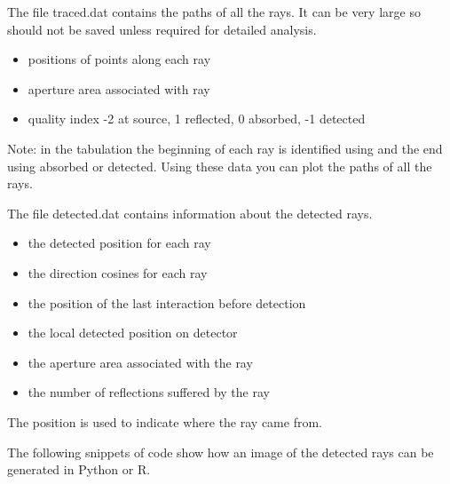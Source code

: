 \documentclass[letterpaper,10pt,english]{sphinxmanual}
\begin{document}
The file traced.dat contains the paths of all the rays. It can be very large
so should not be saved unless required for detailed analysis.
\begin{itemize}
\item {} 
  positions of points along each ray

\item {} 
 aperture area associated with ray

\item {} 
  quality index -2 at source, 1 reflected, 0 absorbed, -1 detected

\end{itemize}

Note: in the tabulation the beginning of each ray is identified using 
and the end using  absorbed or  detected. Using these data
you can plot the paths of all the rays.

The file detected.dat contains information about the detected rays.
\begin{itemize}
\item {} 
  the detected position for each ray

\item {} 
  the direction cosines for each ray

\item {} 
  the position of the last interaction before detection

\item {} 
 the local detected position on detector

\item {} 
  the aperture area associated with the ray

\item {} 
 the number of reflections suffered by the ray

\end{itemize}

The position  is used to indicate where the ray came from.

The following snippets of code show how an image of the detected rays can be
generated in Python or R.
\end{document}
